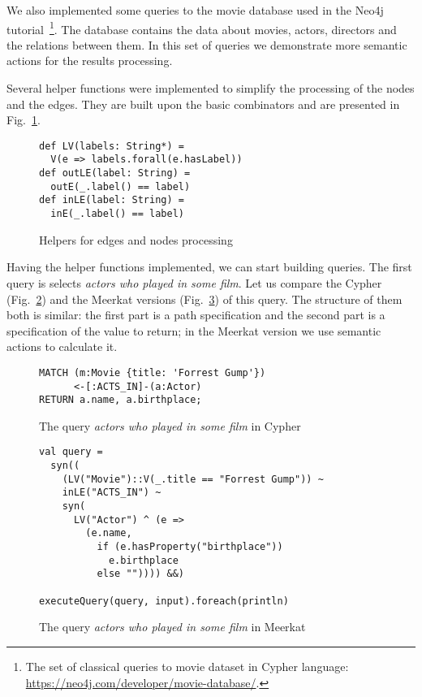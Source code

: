 We also implemented some queries to the movie database used in the Neo4j tutorial~\footnote{The set of classical queries to movie dataset in Cypher language: \url{https://neo4j.com/developer/movie-database/}.}.
The database contains the data about movies, actors, directors and the relations between them.
In this set of queries we demonstrate more semantic actions for the results processing.

Several helper functions were implemented to simplify the processing of the nodes and the edges.
They are built upon the basic combinators and are presented in Fig.~\ref{fig:helpers}.

\begin{figure}[h]
\begin{lstlisting}
def LV(labels: String*) =
  V(e => labels.forall(e.hasLabel))
def outLE(label: String) =
  outE(_.label() == label)
def inLE(label: String) =
  inE(_.label() == label)
\end{lstlisting}
\caption{Helpers for edges and nodes processing}
\label{fig:helpers}
\end{figure}

Having the helper functions implemented, we can start building queries.
The first query is selects \emph{actors who played in some film}.
Let us compare the Cypher (Fig.~\ref{fig:Q1_C}) and the Meerkat versions (Fig.~\ref{fig:Q1_M}) of this query.
The structure of them both is similar: the first part is a path specification and the second part is a specification of the value to return; in the Meerkat version we use semantic actions to calculate it.

\begin{figure}[h]
\begin{lstlisting}
MATCH (m:Movie {title: 'Forrest Gump'})
      <-[:ACTS_IN]-(a:Actor)
RETURN a.name, a.birthplace;
\end{lstlisting}
\caption{The query \emph{actors who played in some film} in Cypher}
\label{fig:Q1_C}
\end{figure}


\begin{figure}[h]
\begin{lstlisting}
val query =
  syn((
    (LV("Movie")::V(_.title == "Forrest Gump")) ~
    inLE("ACTS_IN") ~
    syn(
      LV("Actor") ^ (e =>
        (e.name,
          if (e.hasProperty("birthplace"))
            e.birthplace
          else "")))) &&)

executeQuery(query, input).foreach(println)
\end{lstlisting}
\caption{The query \emph{actors who played in some film} in Meerkat}
\label{fig:Q1_M}
\end{figure}


